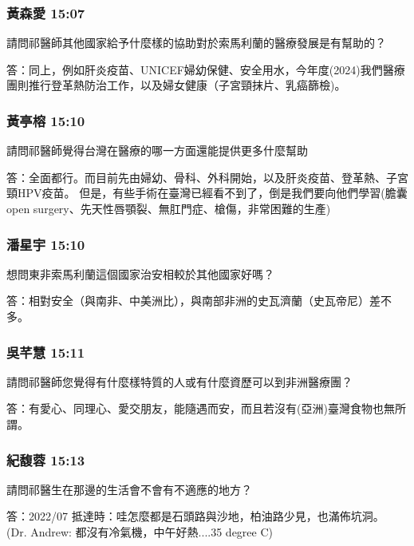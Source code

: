 \documentclass[aspectratio=169]{beamer}
\begin{document}
\begin{frame}
\frametitle{黃森愛 15:07}
請問祁醫師其他國家給予什麼樣的協助對於索馬利蘭的醫療發展是有幫助的？

答：同上，例如肝炎疫苗、UNICEF婦幼保健、安全用水，今年度(2024)我們醫療團則推行登革熱防治工作，以及婦女健康（子宮頸抹片、乳癌篩檢)。
\end{frame}

\begin{frame}
\frametitle{黃亭榕 15:10}
請問祁醫師覺得台灣在醫療的哪一方面還能提供更多什麼幫助

答：全面都行。而目前先由婦幼、骨科、外科開始，以及肝炎疫苗、登革熱、子宮頸HPV疫苗。
但是，有些手術在臺灣已經看不到了，倒是我們要向他們學習(膽囊open surgery、先天性唇顎裂、無肛門症、槍傷，非常困難的生產)
\end{frame}

\begin{frame}
\frametitle{潘星宇 15:10}
想問東非索馬利蘭這個國家治安相較於其他國家好嗎？

答：相對安全（與南非、中美洲比），與南部非洲的史瓦濟蘭（史瓦帝尼）差不多。
\end{frame}

\begin{frame}
\frametitle{吳芊慧 15:11}
請問祁醫師您覺得有什麼樣特質的人或有什麼資歷可以到非洲醫療團？

答：有愛心、同理心、愛交朋友，能隨遇而安，而且若沒有(亞洲)臺灣食物也無所謂。
\end{frame}

\begin{frame}
\frametitle{紀馥蓉 15:13}
請問祁醫生在那邊的生活會不會有不適應的地方？

答：2022/07 抵達時：哇怎麼都是石頭路與沙地，柏油路少見，也滿佈坑洞。\\
(Dr. Andrew: 都沒有冷氣機，中午好熱....35 degree C)
\end{frame}
\end{document}
